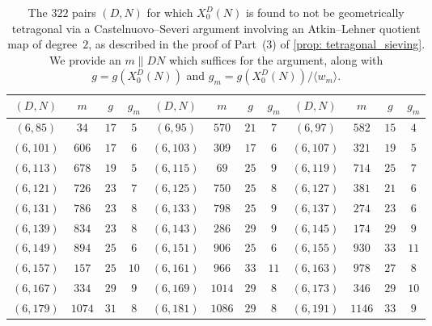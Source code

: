 \documentclass[11pt,reqno]{amsart}
\theoremstyle{definition}
\begin{document}
{
\begin{longtable}{|c|c|c|c||c|c|c|c||c|c|c|c|}
\caption{The $322$ pairs $(D,N)$ for which $X_0^D(N)$ is found to not be geometrically tetragonal via a Castelnuovo--Severi argument involving an Atkin--Lehner quotient map of degree~$2$, as described in the proof of Part~(3) of \cref{prop: tetragonal_sieving}. We provide an $m \parallel DN$ which suffices for the argument, along with $g = g(X_0^D(N))$ and $g_m = g(X_0^D(N))/\langle w_m \rangle$.}\label{table: non-tetragonal_CS2} \\ \hline 
$(D,N)$ & $m$ & $g$ & $g_m$ & $(D,N)$ & $m$ & $g$ & $g_m$ & $(D,N)$ & $m$ & $g$ & $g_m$ \\ \hline \hline
$ (
6 , 85 )$ & $
34 $ & $ 17 $ & $ 5 $
 & 
$ (
6 , 95 )$ & $
570 $ & $ 21 $ & $ 7 $
 & 
$ (
6 , 97 )$ & $
582 $ & $ 15 $ & $ 4 $
\\ \hline
$ (
6 , 101 )$ & $
606 $ & $ 17 $ & $ 6 $
 & 
$ (
6 , 103 )$ & $
309 $ & $ 17 $ & $ 6 $
 & 
$ (
6 , 107 )$ & $
321 $ & $ 19 $ & $ 5 $
\\ \hline
$ (
6 , 113 )$ & $
678 $ & $ 19 $ & $ 5 $
 & 
$ (
6 , 115 )$ & $
69 $ & $ 25 $ & $ 9 $
 & 
$ (
6 , 119 )$ & $
714 $ & $ 25 $ & $ 7 $
\\ \hline
$ (
6 , 121 )$ & $
726 $ & $ 23 $ & $ 7 $
 & 
$ (
6 , 125 )$ & $
750 $ & $ 25 $ & $ 8 $
 & 
$ (
6 , 127 )$ & $
381 $ & $ 21 $ & $ 6 $
\\ \hline
$ (
6 , 131 )$ & $
786 $ & $ 23 $ & $ 8 $
 & 
$ (
6 , 133 )$ & $
798 $ & $ 25 $ & $ 9 $
 & 
$ (
6 , 137 )$ & $
274 $ & $ 23 $ & $ 6 $
\\ \hline
$ (
6 , 139 )$ & $
834 $ & $ 23 $ & $ 8 $
 & 
$ (
6 , 143 )$ & $
286 $ & $ 29 $ & $ 9 $
 & 
$ (
6 , 145 )$ & $
174 $ & $ 29 $ & $ 9 $
\\ \hline
$ (
6 , 149 )$ & $
894 $ & $ 25 $ & $ 6 $
 & 
$ (
6 , 151 )$ & $
906 $ & $ 25 $ & $ 6 $
 & 
$ (
6 , 155 )$ & $
930 $ & $ 33 $ & $ 11 $
\\ \hline
$ (
6 , 157 )$ & $
157 $ & $ 25 $ & $ 10 $
 & 
$ (
6 , 161 )$ & $
966 $ & $ 33 $ & $ 11 $
 & 
$ (
6 , 163 )$ & $
978 $ & $ 27 $ & $ 8 $
\\ \hline
$ (
6 , 167 )$ & $
334 $ & $ 29 $ & $ 9 $
 & 
$ (
6 , 169 )$ & $
1014 $ & $ 29 $ & $ 8 $
 & 
$ (
6 , 173 )$ & $
346 $ & $ 29 $ & $ 10 $
\\ \hline
$ (
6 , 179 )$ & $
1074 $ & $ 31 $ & $ 8 $
 & 
$ (
6 , 181 )$ & $
1086 $ & $ 29 $ & $ 8 $
 & 
$ (
6 , 191 )$ & $
1146 $ & $ 33 $ & $ 9 $
\\ \hline

\end{longtable}}
\end{document}
